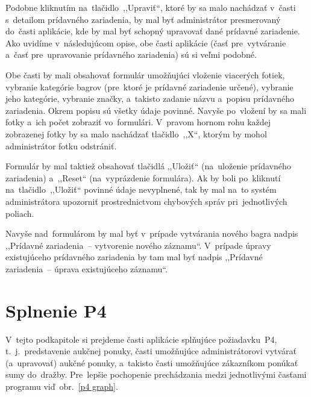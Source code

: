 Podobne kliknutím na~tlačidlo~,,Upraviť``, ktoré by sa malo nachádzať v~časti s~detailom prídavného zariadenia, by mal byť administrátor presmerovaný do~časti aplikácie, kde by mal byť schopný upravovať dané prídavné zariadenie. Ako uvidíme v~následujúcom opise, obe časti aplikácie (časť pre~vytváranie a~časť pre~upravovanie prídavného zariadenia) sú si veľmi podobné.

Obe časti by mali obsahovať formulár umožňujúci vloženie viacerých fotiek, vybranie kategórie bagrov (pre~ktoré je prídavné zariadenie určené), vybranie jeho kategórie, vybranie značky, a~takisto zadanie názvu a~popisu prídavného zariadenia. Okrem popisu sú všetky údaje povinné. Navyše po~vložení by sa mali fotky a~ich počet zobraziť vo~formulári. V~pravom hornom rohu každej zobrazenej fotky by sa malo nachádzať tlačidlo~,,X``, ktorým by mohol administrátor fotku odstrániť.

Formulár by mal taktiež obsahovať tlačidlá ,,Uložiť`` (na~uloženie prídavného zariadenia) a~,,Reset`` (na~vyprázdenie formulára). Ak by boli po~kliknutí na~tlačidlo~,,Uložiť`` povinné údaje nevyplnené, tak by mal na~to systém administrátora upozorniť prostrednictvom chybových správ pri~jednotlivých poliach.

Navyše nad~formulárom by mal byť v~prípade vytvárania nového bagra nadpis ,,Prídavné zariadenia~-- vytvorenie nového záznamu``. V~prípade úpravy existujúceho prídavného zariadenia by tam mal byť nadpis ,,Prídavné zariadenia~-- úprava existujúceho záznamu``.

\section{Splnenie P4}

V~tejto podkapitole si prejdeme časti aplikácie splňujúce požiadavku~P4, t.~j.~predstavenie aukčnej ponuky, časti umožňujúce administrátorovi vytvárať (a~upravovať) aukčné ponuky, a~takisto časti umožňujúce zákazníkom ponúkať sumy do~dražby. Pre~lepšie pochopenie prechádzania medzi jednotlivými časťami programu viď~obr.~\ref{p4 graph}.

